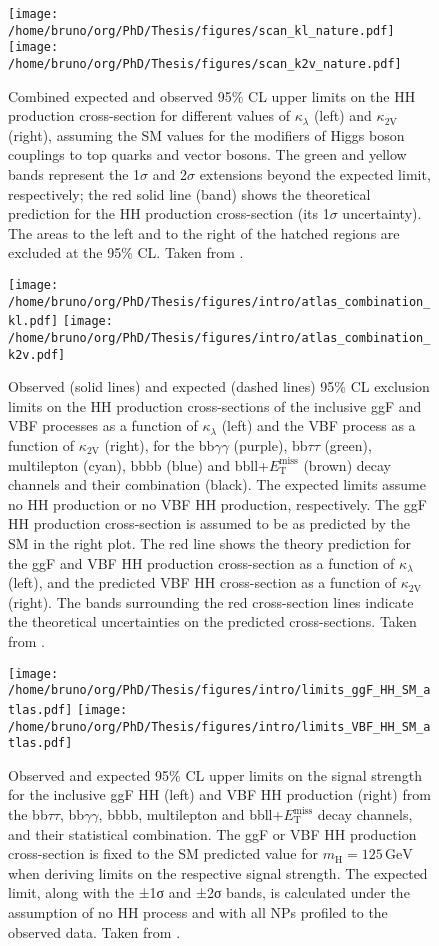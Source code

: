 \documentclass[11pt]{article}
\newcommand{\bbll}{bbll+$E^{\text{miss}}_{\text{T}}$}
\newcommand{\kl}{\kappa_{\lambda}}
\newcommand{\kvv}{\kappa_{\text{2V}}}
\newcommand{\mh}{m_{\text{H}}}
\newcommand{\bbbb}{bbbb}
\newcommand{\bbgg}{bb$\gamma\gamma$}
\newcommand{\bbtt}{bb$\tau\tau$}
\begin{document}
\begin{figure}
\texttt{[image: /home/bruno/org/PhD/Thesis/figures/scan\_kl\_nature.pdf]}
\texttt{[image: /home/bruno/org/PhD/Thesis/figures/scan\_k2v\_nature.pdf]}
\caption{\label{fig:scan_comb_cms_nature}Combined expected and observed 95\% CL upper limits on the HH production cross-section for different values of \(\kl\) (left) and \(\kvv\) (right), assuming the SM values for the modifiers of Higgs boson couplings to top quarks and vector bosons. The green and yellow bands represent the 1\(\sigma\) and 2\(\sigma\) extensions beyond the expected limit, respectively; the red solid line (band) shows the theoretical prediction for the HH production cross-section (its 1\(\sigma\) uncertainty). The areas to the left and to the right of the hatched regions are excluded at the 95\% CL. Taken from \cite{higgs_10_years}.}
\end{figure}

\begin{figure}
\texttt{[image: /home/bruno/org/PhD/Thesis/figures/intro/atlas\_combination\_kl.pdf]}
\texttt{[image: /home/bruno/org/PhD/Thesis/figures/intro/atlas\_combination\_k2v.pdf]}
\caption{\label{fig:scan_comb_atlas}Observed (solid lines) and expected (dashed lines) 95\% CL exclusion limits on the HH production cross-sections of the inclusive \ac{ggF} and \ac{VBF} processes as a function of \(\kl\) (left) and the \ac{VBF} process as a function of \(\kvv\) (right), for the \bbgg{} (purple), \bbtt{} (green), multilepton (cyan), \bbbb{} (blue) and \bbll{} (brown) decay channels and their combination (black). The expected limits assume no HH production or no \ac{VBF} HH production, respectively. The \ac{ggF} HH production cross-section is assumed to be as predicted by the SM in the right plot. The red line shows the theory prediction for the \ac{ggF} and \ac{VBF} HH production cross-section as a function of \(\kl\) (left), and the predicted \ac{VBF} HH cross-section as a function of \(\kvv\) (right). The bands surrounding the red cross-section lines indicate the theoretical uncertainties on the predicted cross-sections. Taken from \cite{atlas_hh_comb}.}
\end{figure}


\begin{figure}
\texttt{[image: /home/bruno/org/PhD/Thesis/figures/intro/limits\_ggF\_HH\_SM\_atlas.pdf]}
\texttt{[image: /home/bruno/org/PhD/Thesis/figures/intro/limits\_VBF\_HH\_SM\_atlas.pdf]}
\caption{\label{fig:limits_comb_atlas}Observed and expected 95\% CL upper limits on the signal strength for the inclusive \ac{ggF} HH (left) and \ac{VBF} HH production (right) from the \bbtt{}, \bbgg{}, \bbbb{}, multilepton and \bbll{} decay channels, and their statistical combination. The \ac{ggF} or \ac{VBF} HH production cross-section is fixed to the SM predicted value for \(\mh=125\,\si{\GeV}\) when deriving limits on the respective signal strength. The expected limit, along with the ±1σ and ±2σ bands, is calculated under the assumption of no HH process and with all NPs profiled to the observed data. Taken from \cite{atlas_hh_comb}.}
\end{figure}
\end{document}
